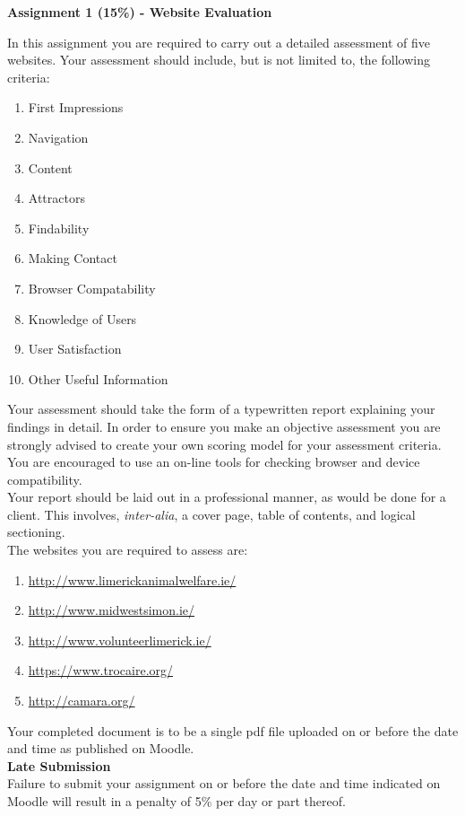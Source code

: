 
	
\begin{flushleft}
\Large\textbf{Assignment 1 (15\%) - Website Evaluation}\\
\end{flushleft}

In this assignment you are required to carry out a detailed assessment of five websites. Your assessment should include, but is not limited to, the following criteria:


\begin{enumerate}
	\item First Impressions
	\item Navigation
	\item Content
	\item Attractors
	\item Findability
	\item Making Contact
	\item Browser Compatability
	\item Knowledge of Users
	\item User Satisfaction
	\item Other Useful Information
\end{enumerate}

Your assessment should take the form of a typewritten report explaining your findings in detail. In order to ensure you make an objective assessment you are strongly advised to create your own scoring model for your assessment criteria. You are encouraged to use an on-line tools for checking browser and device compatibility.\\

Your report should be laid out in a professional manner, as would be done for a client. This involves, \textit{inter-alia}, a cover page, table of contents, and logical sectioning.\\

The websites you are required to assess are:\\

\begin{enumerate}
	\item \href{http://www.limerickanimalwelfare.ie/}{http://www.limerickanimalwelfare.ie/}
	\item \href{http://www.midwestsimon.ie/}{http://www.midwestsimon.ie/}
	\item \href{http://www.volunteerlimerick.ie/}{http://www.volunteerlimerick.ie/}
	\item \href{https://www.trocaire.org/}{https://www.trocaire.org/}
	\item \href{http://camara.org/}{http://camara.org/}
\end{enumerate}

Your completed document is to be a single pdf file uploaded on or before the date and time as published on Moodle.\\

\textbf{Late Submission}\\
Failure to submit your assignment on or before the date and time indicated on Moodle will result in a penalty of 5\% per day or part thereof.  

